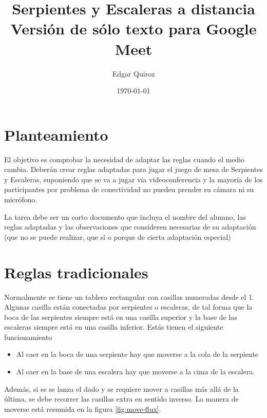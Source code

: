 \documentclass[11pt]{article}
\author{Edgar Quiroz}
\date{\today}
\title{Serpientes y Escaleras a distancia\\\medskip
\large Versión de sólo texto para Google Meet}
\begin{document}
\maketitle

\section{Planteamiento}
\label{sec:orgdbba6c4}

El objetivo es comprobar la necesidad de adaptar las reglas cuando el medio
cambia. Deberán crear reglas adaptadas para jugar el juego de mesa de Serpientes
y Escaleras, suponiendo que se va a jugar vía videoconferencia y la mayoría de
los participantes por problema de conectividad no pueden prender su cámara ni su
micrófono.

La tarea debe ser un corto documento que incluya el nombre del alumno, las
reglas adaptadas y las observaciones que consideren necesarias de su adaptación
(que no se puede realizar, que sí o porque de cierta adaptación especial)

\section{Reglas tradicionales}
\label{sec:orgceb3c79}

Normalmente se tiene un tablero rectangular con casillas numeradas desde el 1.
Algunas casilla están conectadas por serpientes o escaleras, de tal forma que
la boca de las serpientes siempre está en una casilla superior y la base de las
escaleras siempre está en una casilla inferior. Estás tienen el siguiente
funcionamiento

\begin{itemize}
\item Al caer en la boca de una serpiente hay que moverse a la cola de la serpiente
\item Al caer en la base de una escalera hay que moverse a la cima de la escalera.
\end{itemize}

Además, si se se lanza el dado y se requiere mover a casillas más allá de la
última, se debe recorrer las casillas extra en sentido inverso. La manera de
moverse está resumida en la figura \ref{fig:move-flux}.
\end{document}
